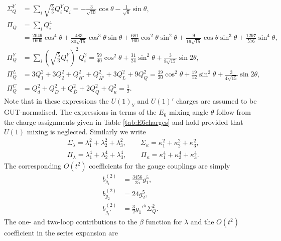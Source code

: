 \documentclass[preprint,amsmath,amssymb,aps,superscriptaddress,prd,showpacs,floatfix,nofootinbib]{revtex4-1}
\begin{document}
\begin{align*}
\Sigma_{Q}^Y&=\sum_i \sqrt{\frac{5}{3}}Q_i^YQ_i=-\frac{3}{\sqrt{10}}\cos\theta-\frac{1}{\sqrt{6}}\sin\theta,\\
\Pi_{Q}&=\sum_i Q_i^4\\
&=\frac{2049}{1600}\cos^4\theta+\frac{483}{80\sqrt{15}}\cos^3\theta\sin\theta+\frac{681}{160}\cos^2\theta\sin^2\theta+\frac{9}{16\sqrt{15}}\cos\theta\sin^3\theta+\frac{1297}{576}\sin^4\theta,\\
\Pi_{Q}^Y&=\sum_i \left ( \sqrt{\frac{5}{3}}Q_i^Y\right )^2Q_i^2=\frac{59}{40}\cos^2\theta+\frac{31}{24}\sin^2\theta+\frac{3}{8\sqrt{15}}\sin 2\theta,\\
\Pi_{Q}^L&=3Q_1^2+3Q_2^2+Q_{H'}^2+Q_{\overline{H'}}^2+3Q_L^2+9Q_Q^2=\frac{39}{20}\cos^2\theta+\frac{19}{12}\sin^2\theta+\frac{3}{4\sqrt{15}}\sin 2\theta,\\
\Pi_{Q}^C&=Q_d^2+Q_D^2+Q_{\overline{D}}^2+2Q_Q^2+Q_u^2=\frac{1}{2}.
\end{align*}
Note that in these expressions the $U(1)_Y$ and $U(1)'$ charges are assumed to be GUT-normalised. The expressions in terms of the $E_6$ mixing angle $\theta$ follow from the charge assignments given in Table \ref{tab:E6charges} and hold provided that $U(1)$ mixing is neglected. Similarly we write
\begin{align*}
&\Sigma_\lambda=\lambda_1^2+\lambda_2^2+\lambda_3^2, \qquad \Sigma_\kappa=\kappa_1^2+\kappa_2^2+\kappa_3^2,\\
&\Pi_\lambda=\lambda_1^4+\lambda_2^4+\lambda_3^4,\qquad \Pi_\kappa=\kappa_1^4+\kappa_2^4+\kappa_3^4.
\end{align*}
The corresponding $O(t^2)$ coefficients for the gauge couplings are simply
\begin{subequations}\label{eq:USSMGaugeOt2Coeffs}
\begin{align}
b_{g_1}^{(2)}&=\frac{3456}{25}g_1^5,\label{eq:USSMg1Ot2Coeff}\\
b_{g_2}^{(2)}&=24g_2^5,\label{eq:USSMg2Ot2Coeff}\\
b_{g_1'}^{(2)}&=\frac{3}{2}g_1'^5\Sigma_{Q}^2.\label{eq:USSMg1pOt2Coeff}
\end{align}
\end{subequations}
The one- and two-loop contributions to the $\beta$ function for $\lambda$
and the $O(t^2)$ coefficient in the series expansion are
\end{document}
